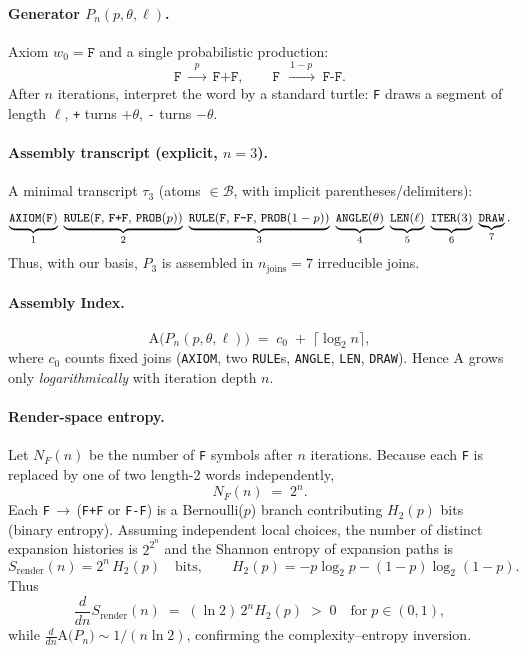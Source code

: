 \documentclass[12pt,a4paper]{article}
\theoremstyle{plain}
\theoremstyle{definition}
\theoremstyle{remark}
\newcommand{\Sfield}{S}
\newcommand{\AI}{\mathrm{A}}
\begin{document}
\paragraph{Generator $P_n(p,\theta,\ell)$.}
Axiom $w_0=\texttt{F}$ and a single probabilistic production:
\[
\texttt{F}\;\xrightarrow{\;\;p\;\;}\;\texttt{F+F},\qquad
\texttt{F}\;\xrightarrow{\;1-p\;}\;\texttt{F-F}.
\]
After $n$ iterations, interpret the word by a standard turtle: \texttt{F} draws a segment of length $\ell$, \texttt{+} turns $+\theta$, \texttt{-} turns $-\theta$.

\paragraph{Assembly transcript (explicit, $n=3$).}
A minimal transcript $\tau_3$ (atoms $\in\mathcal{B}$, with implicit parentheses/delimiters):
\[
\small
\underbrace{\texttt{AXIOM}(\texttt{F})}_{1}\;
\underbrace{\texttt{RULE}(\texttt{F},\,\texttt{F+F},\,\texttt{PROB}(p))}_{2}\;
\underbrace{\texttt{RULE}(\texttt{F},\,\texttt{F-F},\,\texttt{PROB}(1-p))}_{3}\;
\underbrace{\texttt{ANGLE}(\theta)}_{4}\;
\underbrace{\texttt{LEN}(\ell)}_{5}\;
\underbrace{\texttt{ITER}(3)}_{6}\;
\underbrace{\texttt{DRAW}}_{7}.
\]
Thus, with our basis, $P_3$ is assembled in $n_\mathrm{joins}=7$ irreducible joins.

\paragraph{Assembly Index.}
\[
\AI\big(P_n(p,\theta,\ell)\big)\;=\; c_0 \;+\; \Big\lceil\log_2 n\Big\rceil,
\]
where $c_0$ counts fixed joins (\texttt{AXIOM}, two \texttt{RULE}s, \texttt{ANGLE}, \texttt{LEN}, \texttt{DRAW}). Hence $\AI$ grows only \emph{logarithmically} with iteration depth $n$.

\paragraph{Render-space entropy.}
Let $N_F(n)$ be the number of \texttt{F} symbols after $n$ iterations. Because each \texttt{F} is replaced by one of two length-2 words independently,
\[
N_F(n) \;=\; 2^n.
\]
Each \texttt{F}\,$\to$\,(\texttt{F+F} or \texttt{F-F}) is a Bernoulli($p$) branch contributing $H_2(p)$ bits (binary entropy). Assuming independent local choices, the number of distinct expansion histories is $2^{2^n}$ and the Shannon entropy of expansion paths is
\[
\Sfield_{\mathrm{render}}(n) = 2^{n}\,H_2(p) \quad\text{bits},\qquad H_2(p)=-p\log_2 p-(1-p)\log_2(1-p).
\]
Thus
\[
\frac{d}{dn}\Sfield_{\mathrm{render}}(n)\;=\;(\ln 2)\,2^{n} H_2(p)\;>\;0\quad\text{for}\;p\in(0,1),
\]
while $\frac{d}{dn}\AI\big(P_n\big)\sim 1/(n\ln 2)$, confirming the complexity–entropy inversion.
\end{document}
